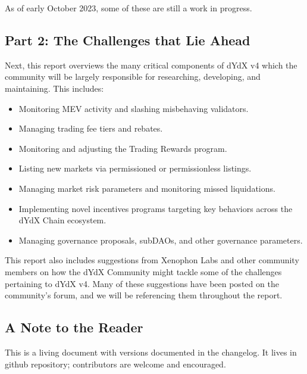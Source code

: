 \begin{fullwidth}
\begin{adjustwidth}{1cm}{1cm}
        As of early October 2023, some of these are still a work in progress. 
    
        \subsection*{Part 2: The Challenges that Lie Ahead} 
        
        Next, this report overviews the many critical components of dYdX v4 which the community will be largely responsible for researching, developing, and maintaining. This includes: %
    
        \begin{itemize}
            \item Monitoring MEV activity and slashing misbehaving validators.
            \item Managing trading fee tiers and rebates.
            \item Monitoring and adjusting the Trading Rewards program.
            \item Listing new markets via permissioned or permissionless listings.
            \item Managing market risk parameters and monitoring missed liquidations.
            \item Implementing novel incentives programs targeting key behaviors across the dYdX Chain ecosystem.
            \item Managing governance proposals, subDAOs, and other governance parameters.
        \end{itemize}
    
        This report also includes suggestions from Xenophon Labs and other community members on how the dYdX Community might tackle some of the challenges pertaining to dYdX v4. Many of these suggestions have been posted on the community's forum, and we will be referencing them throughout the report. 
    
        \subsection*{A Note to the Reader} 
        
        This is a living document with versions documented in the changelog. It lives in  github repository; contributors are welcome and encouraged.
    

\end{adjustwidth}
\end{fullwidth}
